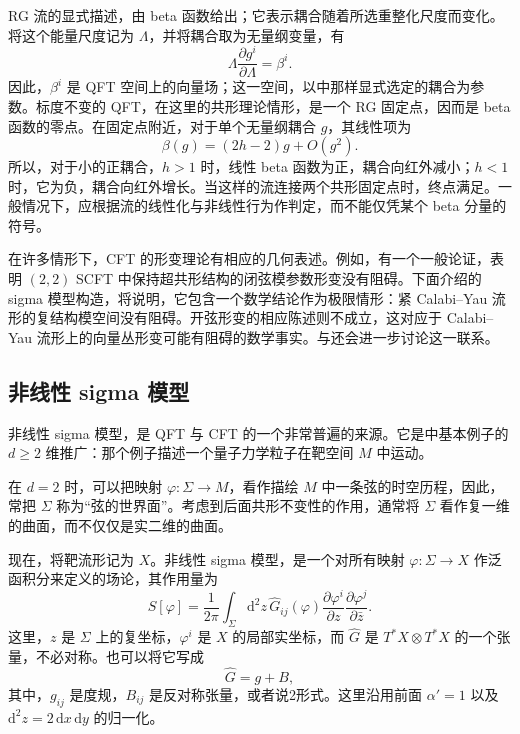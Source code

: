 RG 流的显式描述，由 beta 函数给出；它表示耦合随着所选重整化尺度而变化。将这个能量尺度记为 $\Lambda$，并将耦合取为无量纲变量，有
\begin{equation}\label{eq:3.74}
\Lambda\frac{\partial g^i}{\partial\Lambda}=\beta^i.
\end{equation}
因此，$\beta^i$ 是 QFT 空间上的向量场；这一空间，以中那样显式选定的耦合为参数。标度不变的 QFT，在这里的共形理论情形，是一个 RG 固定点，因而是 beta 函数的零点。在固定点附近，对于单个无量纲耦合 $g$，其线性项为
\[
\beta(g)=(2h-2)g+O(g^2).
\]
所以，对于小的正耦合，$h>1$ 时，线性 beta 函数为正，耦合向红外减小；$h<1$ 时，它为负，耦合向红外增长。当这样的流连接两个共形固定点时，终点满足。一般情况下，应根据流的线性化与非线性行为作判定，而不能仅凭某个 beta 分量的符号。

在许多情形下，CFT 的形变理论有相应的几何表述。例如，有一个一般论证，表明 $(2,2)$ SCFT 中保持超共形结构的闭弦模参数形变没有阻碍。下面介绍的 sigma 模型构造，将说明，它包含一个数学结论作为极限情形：紧 Calabi--Yau 流形的复结构模空间没有阻碍。开弦形变的相应陈述则不成立，这对应于 Calabi--Yau 流形上的向量丛形变可能有阻碍的数学事实。与还会进一步讨论这一联系。

\subsection{非线性 sigma 模型}\label{sec:3.2.6}

非线性 sigma 模型，是 QFT 与 CFT 的一个非常普遍的来源。它是中基本例子的 $d\ge2$ 维推广：那个例子描述一个量子力学粒子在靶空间 $M$ 中运动。

在 $d=2$ 时，可以把映射 $\varphi\colon\Sigma\to M$，看作描绘 $M$ 中一条弦的时空历程，因此，常把 $\Sigma$ 称为“弦的世界面”。考虑到后面共形不变性的作用，通常将 $\Sigma$ 看作复一维的曲面，而不仅仅是实二维的曲面。

现在，将靶流形记为 $X$。非线性 sigma 模型，是一个对所有映射 $\varphi\colon\Sigma\to X$ 作泛函积分来定义的场论，其作用量为
\begin{equation}\label{eq:3.75}
S[\varphi]=\frac1{2\pi}\int_\Sigma\mathrm{d}^2z\,
\widehat G_{ij}(\varphi)
\frac{\partial\varphi^i}{\partial z}
\frac{\partial\varphi^j}{\partial\bar z}.
\end{equation}
这里，$z$ 是 $\Sigma$ 上的复坐标，$\varphi^i$ 是 $X$ 的局部实坐标，而 $\widehat G$ 是 $T^*X\otimes T^*X$ 的一个张量，不必对称。也可以将它写成
\[
\widehat G=g+B,
\]
其中，$g_{ij}$ 是度规，$B_{ij}$ 是反对称张量，或者说2形式。这里沿用前面 $\alpha'=1$ 以及 $\mathrm{d}^2z=2\,\mathrm{d}x\,\mathrm{d}y$ 的归一化。

